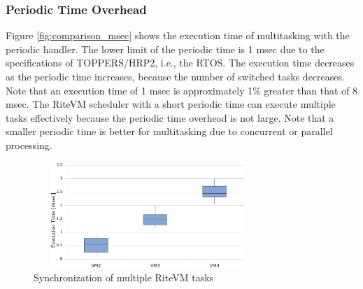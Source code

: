 \documentclass[conference]{IEEEtran/IEEEtran/IEEEtran}
\begin{document}
\subsubsection{Periodic Time Overhead}
Figure \ref{fig:comparison_msec} shows the execution time of multitasking with the periodic handler.
The lower limit of the periodic time is 1 msec due to the specifications of TOPPERS/HRP2, i.e., the RTOS.
The execution time decreases as the periodic time increases, because the number of switched tasks decreases.
Note that an execution time of 1 msec is approximately 1\% greater than that of 8 msec.
The RiteVM scheduler with a short periodic time can execute multiple tasks effectively because the periodic time overhead is not large.
Note that a smaller periodic time is better for multitasking due to concurrent or parallel processing.

 \begin{figure}[t]
    \centering
    \includegraphics[height=4.0cm,width=8.6cm,clip]{figure/eval_synchronization.eps}
    \vspace{-3mm}
\caption{Synchronization of multiple RiteVM tasks}
    \vspace{-3mm}
\label{fig:eval_synchronization}
\end{figure}
\end{document}
